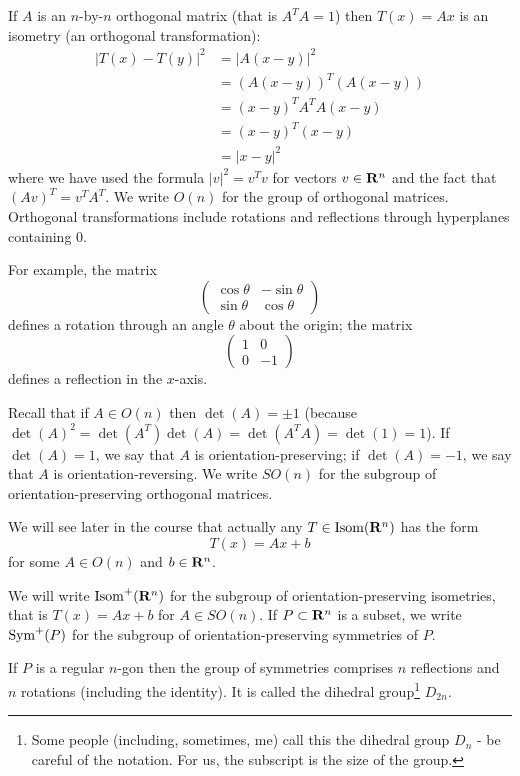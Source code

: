 \documentclass[12pt]{article}
\begin{document}
\begin{exm}
If $A$ is an $n$-by-$n$ orthogonal matrix (that is $A^TA=1$) then $T(x)=Ax$ is an isometry (an orthogonal transformation):
\begin{align*}
|T(x)-T(y)|^2&=|A(x-y)|^2\\
&=(A(x-y))^T(A(x-y))\\
&=(x-y)^TA^TA(x-y)\\
&=(x-y)^T(x-y)\\
&=|x-y|^2
\end{align*}
where we have used the formula $|v|^2=v^Tv$ for vectors $v\in\mathbf{R}^n$ and the fact that $(Av)^T=v^TA^T$. We write $O(n)$ for the group of orthogonal matrices. Orthogonal transformations include rotations and reflections through hyperplanes containing 0.

For example, the matrix
\[\left(\begin{array}{cc}
\cos\theta&-\sin\theta\\
\sin\theta&\cos\theta
\end{array}\right)\]
defines a rotation through an angle $\theta$ about the origin; the matrix
\[\left(\begin{array}{cc}
1&0\\
0&-1
\end{array}\right)\]
defines a reflection in the $x$-axis.

Recall that if $A\in O(n)$ then $\det(A)=\pm 1$ (because $\det(A)^2=\det(A^T)\det(A)=\det(A^TA)=\det(1)=1$). If $\det(A)=1$, we say that $A$ is orientation-preserving; if $\det(A)=-1$, we say that $A$ is orientation-reversing. We write $SO(n)$ for the subgroup of orientation-preserving orthogonal matrices.
\end{exm}

We will see later in the course that actually any $T\in\operatorname{Isom}(\mathbf{R}^n)$ has the form
\[T(x)=Ax+b\]
for some $A\in O(n)$ and $b\in\mathbf{R}^n$.

\begin{dfn}
We will write $\operatorname{Isom}^+(\mathbf{R}^n)$ for the subgroup of orientation-preserving isometries, that is $T(x)=Ax+b$ for $A\in SO(n)$. If $P\subset\mathbf{R}^n$ is a subset, we write $\operatorname{Sym}^+(P)$ for the subgroup of orientation-preserving symmetries of $P$.
\end{dfn}

\begin{exm}
If $P$ is a regular $n$-gon then the group of symmetries comprises $n$ reflections and $n$ rotations (including the identity). It is called the dihedral group\footnote{Some people (including, sometimes, me) call this the dihedral group $D_n$ - be careful of the notation. For us, the subscript is the size of the group.} $D_{2n}$.
\end{exm}
\end{document}
